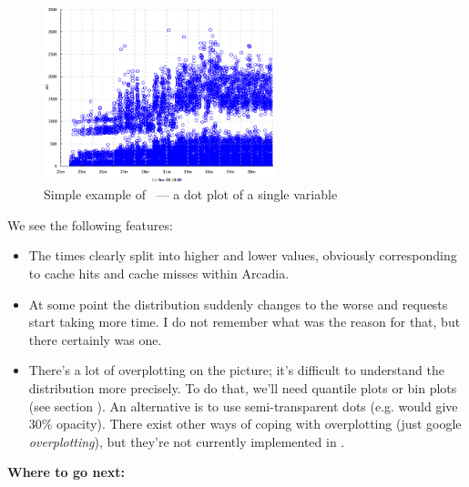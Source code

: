 \documentclass{article}
\begin{document}
\begin{figure}[h!]
\center
\includegraphics[width=0.6\textwidth]{pics/tplot/dots.png}
\caption{Simple example of \timeplot{}~--- a dot plot of a single variable}
\label{fig:tplot-simple-example}
\end{figure}

We see the following features:
\begin{itemize}
\item The times clearly split into higher and lower values, obviously corresponding to cache hits and cache misses within Arcadia.
\item At some point the distribution suddenly changes to the worse and requests start taking more time. I do not remember what was the reason for that, but there certainly was one.
\item There's a lot of overplotting on the picture; it's difficult to understand the distribution more precisely. To do that, we'll need quantile plots or bin plots (see section ). An alternative is to use semi-transparent dots (e.g.  would give 30\% opacity). There exist other ways of coping with overplotting (just google \emph{overplotting}), but they're not currently implemented in \timeplot{}.
\end{itemize}

\textbf{Where to go next:}
\end{document}
